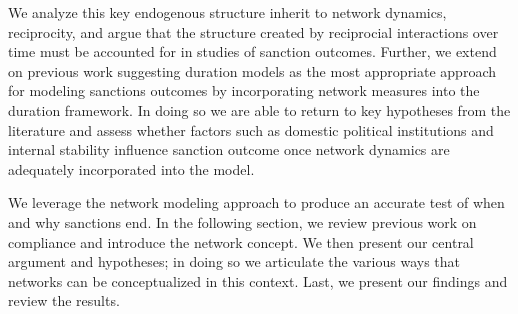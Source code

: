 We analyze this key endogenous structure inherit to network dynamics, reciprocity, and argue that the structure created by reciprocial interactions over time must be accounted for in studies of sanction outcomes. Further, we extend on previous work suggesting duration models as the most appropriate approach for modeling sanctions outcomes by incorporating network measures into the duration framework. In doing so we are able to return to key hypotheses from the literature and assess whether factors such as domestic political institutions and internal stability influence sanction outcome once network dynamics are adequately incorporated into the model. 

We leverage the network modeling approach to produce an accurate test of when and why sanctions end. In the following section, we review previous work on compliance and introduce the network concept. We then present our central argument and hypotheses; in doing so we articulate the various ways that networks can be conceptualized in this context. Last, we present our findings and review the results.


